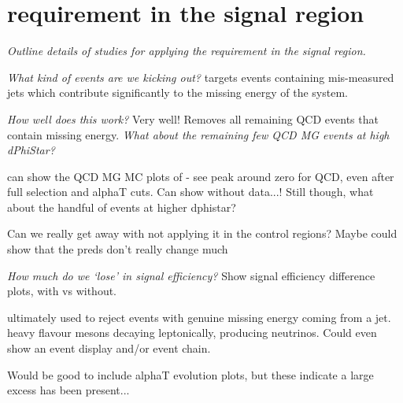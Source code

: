 \label{ch:app_dphistar}


\chapter{\dphistar requirement in the signal region}

\emph{Outline details of studies for applying the \dphistar requirement in the
signal region.}

\emph{What kind of events are we kicking out?} targets events containing
mis-measured jets which contribute significantly to the missing energy of the
system.

\emph{How well does this work?} Very well! Removes all remaining QCD events that
contain missing energy. \emph{What about the remaining few QCD MG events at high
dPhiStar?}

can show the QCD MG MC plots of \dphistar - see peak around zero for QCD, even
after full selection and alphaT cuts. Can show without data...! Still though,
what about the handful of events at higher dphistar?

Can we really get away with not applying it in the control regions?
    Maybe could show that the preds don't really change much

\emph{How much do we `lose' in signal efficiency?} Show signal efficiency
difference plots, with vs without.

ultimately used to reject events with genuine missing energy coming from a jet.
heavy flavour mesons decaying leptonically, producing neutrinos. Could even show
an event display and/or event chain.

Would be good to include alphaT evolution plots, but these indicate a large
excess has been present...